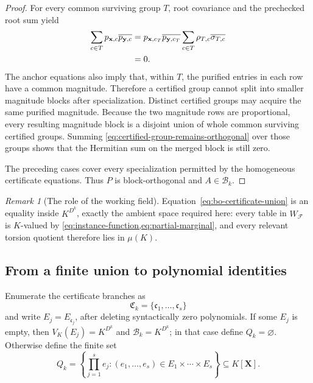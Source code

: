 \documentclass[11pt]{article}
\theoremstyle{plain}
\theoremstyle{definition}
\theoremstyle{remark}
\newtheorem{remark}[remark]{Remark}
\newcommand{\cF}{\mathcal F}
\begin{document}
\begin{proof}
For every common surviving group $T$, root covariance and the prechecked
root sum yield
\begin{align}
  \sum_{c\in T}p_{\mathbf x,c}\overline{p_{\mathbf y,c}}
  &=p_{\mathbf x,c_T}\overline{p_{\mathbf y,c_T}}
    \sum_{c\in T}\rho_{T,c}\overline{\sigma_{T,c}}\notag\\
  &=0.
  \label{eq:certified-group-remains-orthogonal}
\end{align}
The anchor equations also imply that, within $T$, the purified entries in each
row have a common magnitude.  Therefore a certified group cannot split into
smaller magnitude blocks after specialization.  Distinct certified
groups may acquire the same purified magnitude.  Because the two magnitude
rows are proportional, every resulting magnitude block is a disjoint union
of whole common surviving certified groups.  Summing
\eqref{eq:certified-group-remains-orthogonal} over those groups shows that
the Hermitian sum on the merged block is still zero.

The preceding cases cover every specialization permitted by the homogeneous
certificate equations.  Thus $P$ is block-orthogonal and
$A\in\mathcal B_k$.
\end{proof}

\begin{remark}[The role of the working field]
\label{rem:bo-certificates-k-points}
Equation~\eqref{eq:bo-certificate-union} is an equality inside $K^{D^k}$,
exactly the ambient space required here: every table in $W_{\cF}$
is $K$-valued by \cref{eq:instance-function,eq:partial-marginal}, and every
relevant torsion quotient therefore lies in $\mu(K)$.
\end{remark}

\subsection{From a finite union to polynomial identities}

Enumerate the certificate branches as
\[
  \mathfrak C_k=\{\mathfrak c_1,\ldots,\mathfrak c_s\}
\]
and write $E_j=E_{\mathfrak c_j}$, after deleting syntactically zero
polynomials.  If some $E_j$ is empty, then
$V_K(E_j)=K^{D^k}$ and $\mathcal B_k=K^{D^k}$; in that case define
$Q_k=\varnothing$.  Otherwise define the finite set
\begin{equation*}
  Q_k=
  \left\{
    \prod_{j=1}^s e_j:
    (e_1,\ldots,e_s)\in E_1\times\cdots\times E_s
  \right\}
  \subseteq K[\mathbf X].
\end{equation*}
\end{document}
